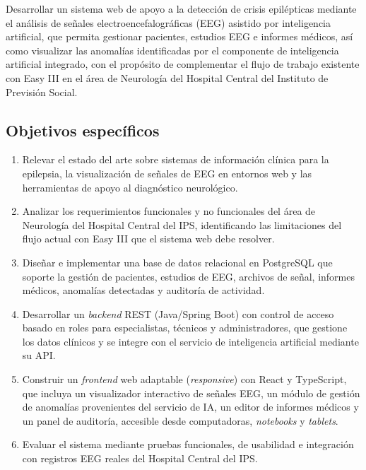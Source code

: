 Desarrollar un sistema web de apoyo a la detección de crisis epilépticas
mediante el análisis de señales electroencefalográficas (EEG) asistido
por inteligencia artificial, que permita gestionar pacientes, estudios
EEG e informes médicos, así como visualizar las anomalías identificadas
por el componente de inteligencia artificial integrado, con el propósito
de complementar el flujo de trabajo existente con Easy III en el
área de Neurología del Hospital Central del Instituto de Previsión Social.

\subsection{Objetivos específicos}
\label{subsec:objetivos-especificos}

\begin{enumerate}
    \item Relevar el estado del arte sobre sistemas de información clínica para la epilepsia, la visualización de señales de EEG en entornos web y las herramientas de apoyo al diagnóstico neurológico.

    \item Analizar los requerimientos funcionales y no funcionales del área de Neurología del Hospital Central del IPS, identificando las limitaciones del flujo actual con Easy III que el sistema web debe resolver.

    \item Diseñar e implementar una base de datos relacional en PostgreSQL que soporte la gestión de pacientes, estudios de EEG, archivos de señal, informes médicos, anomalías detectadas y auditoría de actividad.

    \item Desarrollar un \textit{backend} REST (Java/Spring Boot) con control de acceso basado en roles para especialistas, técnicos y administradores, que gestione los datos clínicos y se integre con el servicio de inteligencia artificial mediante su API.

    \item Construir un \textit{frontend} web adaptable (\textit{responsive}) con React y TypeScript, que incluya un visualizador interactivo de señales EEG, un módulo de gestión de anomalías provenientes del servicio de IA, un editor de informes médicos y un panel de auditoría, accesible desde computadoras, \textit{notebooks} y \textit{tablets}.

    \item Evaluar el sistema mediante pruebas funcionales, de usabilidad e integración con registros EEG reales del Hospital Central del IPS.
\end{enumerate}

